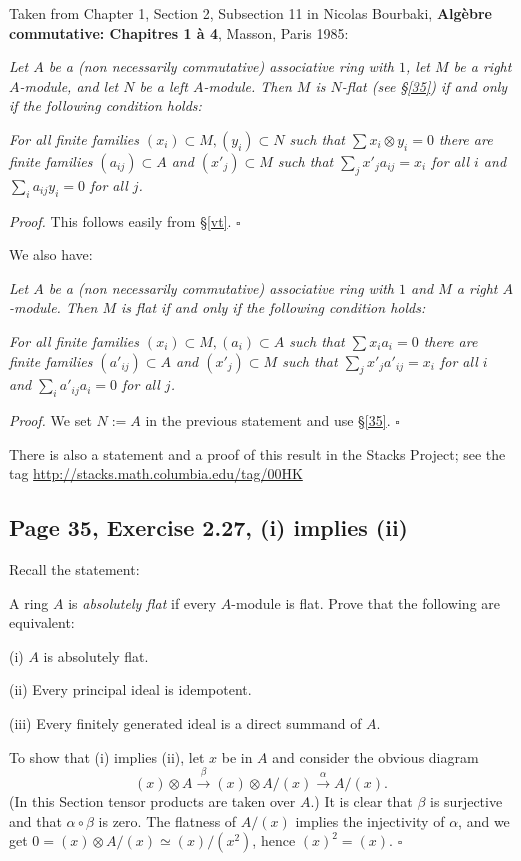 \documentclass[parskip=half,fontsize=12pt]{scrartcl}%
\newcommand{\xr}{\xrightarrow}
\begin{document}
Taken from Chapter 1, Section 2, Subsection 11 in Nicolas Bourbaki, \textbf{Algèbre commutative: Chapitres 1 à 4}, Masson, Paris 1985:

\emph{Let $A$ be a (non necessarily commutative) associative ring with $1$, let $M$ be a right $A$-module, and let $N$ be a left $A$-module. Then $M$ is $N$-flat (see \S\ref{35}) if and only if the following condition holds:}

\emph{For all finite families $(x_i)\subset M,(y_i)\subset N$ such that $\sum x_i\otimes y_i=0$ there are finite families $(a_{ij})\subset A$ and $(x'_j)\subset M$ such that $\sum_jx'_ja_{ij}=x_i$ for all $i$ and $\sum_ia_{ij}y_i=0$ for all $j$.}

\emph{Proof.} This follows easily from \S\ref{vt}. $\square$

We also have:

\emph{Let $A$ be a (non necessarily commutative) associative ring with $1$ and $M$ a right $A$-module. Then $M$ is flat if and only if the following condition holds:}

\emph{For all finite families $(x_i)\subset M,(a_i)\subset A$ such that $\sum x_ia_i=0$ there are finite families $(a'_{ij})\subset A$ and $(x'_j)\subset M$ such that $\sum_jx'_ja'_{ij}=x_i$ for all $i$ and $\sum_ia'_{ij}a_i=0$ for all $j$.}

\emph{Proof.} We set $N:=A$ in the previous statement and use \S\ref{35}. $\square$

There is also a statement and a proof of this result in the Stacks Project; see the tag \href{http://stacks.math.columbia.edu/tag/00HK}{http://stacks.math.columbia.edu/tag/00HK}

\subsection{Page 35, Exercise 2.27, (i) implies (ii)}\label{227}%

Recall the statement: 

A ring $A$ is \emph{absolutely flat} if every $A$-module is flat. Prove that the following are equivalent:

(i) $A$ is absolutely flat.

(ii) Every principal ideal is idempotent.

(iii) Every finitely generated ideal is a direct summand of $A$.

To show that (i) implies (ii), let $x$ be in $A$ and consider the obvious diagram 
$$
(x)\otimes A\xr\beta(x)\otimes A/(x)\xr\alpha A/(x). 
$$ 
(In this Section tensor products are taken over $A$.) It is clear that $\beta$ is surjective and that $\alpha\circ\beta$ is zero. The flatness of $A/(x)$ implies the injectivity of $\alpha$, and we get $0=(x)\otimes A/(x)\simeq(x)/(x^2)$, hence $(x)^2=(x)$. $\square$
\end{document}
